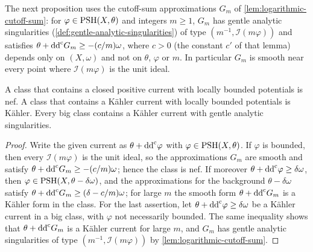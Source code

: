 The next proposition uses the cutoff-sum approximations $G_m$ of \cref{lem:logarithmic-cutoff-sum}: for $\varphi\in\mathrm{PSH}(X,\theta)$ and integers $m\geq1$, $G_m$ has gentle analytic singularities (\cref{def:gentle-analytic-singularities}) of type $(m^{-1},\mathcal I(m\varphi))$ and satisfies $\theta+\mathrm{dd}^{\mathrm{c}} G_m\geq-(c/m)\omega$, where $c>0$ (the constant $c'$ of that lemma) depends only on $(X,\omega)$ and not on $\theta$, $\varphi$ or $m$. In particular $G_m$ is smooth near every point where $\mathcal I(m\varphi)$ is the unit ideal.

\begin{proposition}\label{prop:bounded-potential-nef}
A class that contains a closed positive current with locally bounded potentials is nef. A class that contains a K\"ahler current with locally bounded potentials is K\"ahler. Every big class contains a K\"ahler current with gentle analytic singularities.
\end{proposition}
\begin{proof}
Write the given current as $\theta+\mathrm{dd}^{\mathrm{c}}\varphi$ with $\varphi\in\mathrm{PSH}(X,\theta)$. If $\varphi$ is bounded, then every $\mathcal I(m\varphi)$ is the unit ideal, so the approximations $G_m$ are smooth and satisfy $\theta+\mathrm{dd}^{\mathrm{c}} G_m\geq-(c/m)\omega$; hence the class is nef. If moreover $\theta+\mathrm{dd}^{\mathrm{c}}\varphi\geq\delta\omega$, then $\varphi\in\mathrm{PSH}(X,\theta-\delta\omega)$, and the approximations for the background $\theta-\delta\omega$ satisfy $\theta+\mathrm{dd}^{\mathrm{c}} G_m\geq(\delta-c/m)\omega$; for large $m$ the smooth form $\theta+\mathrm{dd}^{\mathrm{c}} G_m$ is a K\"ahler form in the class. For the last assertion, let $\theta+\mathrm{dd}^{\mathrm{c}}\varphi\geq\delta\omega$ be a K\"ahler current in a big class, with $\varphi$ not necessarily bounded. The same inequality shows that $\theta+\mathrm{dd}^{\mathrm{c}} G_m$ is a K\"ahler current for large $m$, and $G_m$ has gentle analytic singularities of type $(m^{-1},\mathcal I(m\varphi))$ by \cref{lem:logarithmic-cutoff-sum}.
\end{proof}


